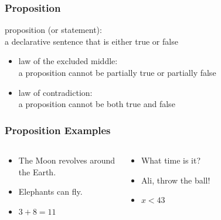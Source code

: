 \documentclass[dvipsnames]{beamer}
\begin{document}
\begin{frame}
  \frametitle{Proposition}

  \begin{definition}
    \alert{proposition} (or \alert{statement}):\\
      a declarative sentence that is either true or false
  \end{definition}

  \pause
  \begin{itemize}
    \item \alert{law of the excluded middle}:\\
      a proposition cannot be partially true or partially false
  \end{itemize}

  \pause
  \begin{itemize}
    \item \alert{law of contradiction}:\\
      a proposition cannot be both true and false
  \end{itemize}
\end{frame}

\begin{frame}
  \frametitle{Proposition Examples}

  \begin{columns}[t]
    \begin{example}[proposition]
      \begin{itemize}
        \item The Moon revolves around\\
          the Earth.
        \item Elephants can fly.
        \item $3+8=11$
      \end{itemize}
    \end{example}

    \pause
    \begin{example}
      \begin{itemize}
        \item What time is it?
        \item Ali, throw the ball!
        \item $x<43$
      \end{itemize}
    \end{example}
  \end{columns}
\end{frame}
\end{document}

